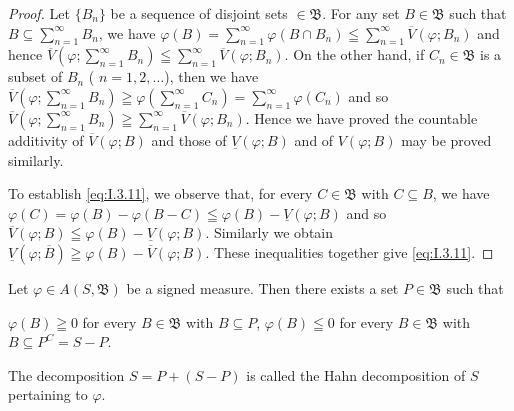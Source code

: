 \begin{proof}
 Let $\{B_n\}$ be a sequence of disjoint sets $\in \mathfrak{B}$. For any set $B \in \mathfrak{B}$ such that $B \subseteq \sum\limits_{n=1}^{\infty} B_n$, we have $\varphi(B) = \sum\limits_{n=1}^{\infty} \varphi(B \cap B_n) \leqq \sum\limits_{n=1}^{\infty} \overline{V}(\varphi; B_n)$ and hence $\overline{V}\left(\varphi; \sum\limits_{n=1}^{\infty} B_n\right) \leqq \sum\limits_{n=1}^{\infty} \overline{V}(\varphi; B_n)$. On the other hand, if $C_n \in \mathfrak{B}$ is a subset of $B_n$ ( $n = 1, 2, \ldots$), then we have $\overline{V}\left(\varphi; \sum\limits_{n=1}^{\infty} B_n\right) \geqq \varphi\left(\sum\limits_{n=1}^{\infty} C_n\right) = \sum\limits_{n=1}^{\infty} \varphi(C_n)$ and so $\overline{V}\left(\varphi; \sum\limits_{n=1}^{\infty} B_n\right) \geqq \sum\limits_{n=1}^{\infty} \overline{V}(\varphi; B_n)$. Hence we have proved the countable additivity of $\overline{V}(\varphi; B)$ and those of $\underline{V}(\varphi; B)$ and of $V(\varphi; B)$ may be proved similarly. 


To establish \eqref{eq:I.3.11}, we observe that, for every $C \in \mathfrak{B}$ with $C \subseteq B$, we have $\varphi(C) = \varphi(B)- \varphi(B- C) \leqq \varphi(B)- \underline{V}(\varphi; B)$ and so $\overline{V}(\varphi; B) \leqq \varphi(B)- \underline{V}(\varphi; B)$. Similarly we obtain $\underline{V}(\varphi; \overline{B}) \geqq \varphi(B)- \overline{V}(\varphi; B)$. These inequalities together give \eqref{eq:I.3.11}.
\end{proof}

\begin{theorem}\label{thm:I.3.Theorem.3} Let $\varphi \in A(S, \mathfrak{B})$ be a signed measure. Then there exists a set $P\in \mathfrak{B}$ such that 

$\varphi(B) \geqq 0$ for every $B \in \mathfrak{B}$ with $B \subseteq P$, 
$\varphi(B) \leqq 0$ for every $B \in \mathfrak{B}$ with $B \subseteq P^{C} = S- P$. 
\end{theorem}

The decomposition $S = P+ (S- P)$ is called the Hahn decomposition of $S$ pertaining to $\varphi$. 

